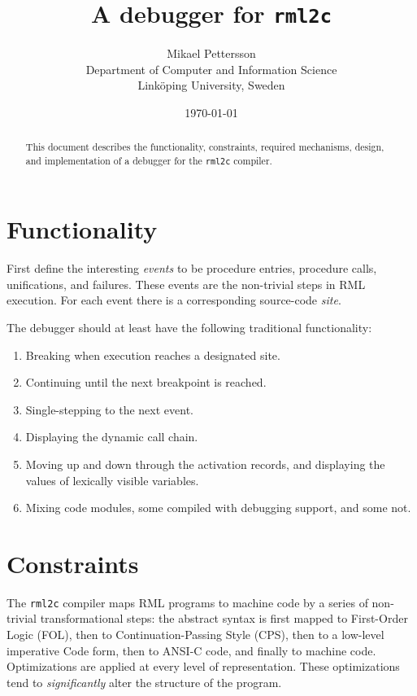 \documentclass[12pt,a4paper]{article}
\begin{document}
%
\title{		A debugger for \texttt{rml2c}}
\author{	Mikael Pettersson\\
		Department of Computer and Information Science\\
		Link{\"o}ping University, Sweden}
\date{		\today}
\maketitle
%
\begin{abstract}
This document describes the functionality, constraints, required mechanisms,
design, and implementation of a debugger for the \texttt{rml2c} compiler.
\end{abstract}
%
\section{Functionality}
First define the interesting \emph{events} to be
procedure entries, procedure calls, unifications, and failures.
These events are the non-trivial steps in RML execution.
For each event there is a corresponding source-code \emph{site}.

The debugger should at least have the following traditional functionality:
\begin{enumerate}
\item Breaking when execution reaches a designated site.
\item Continuing until the next breakpoint is reached.
\item Single-stepping to the next event.
\item Displaying the dynamic call chain.
\item Moving up and down through the activation records,
and displaying the values of lexically visible variables.
\item Mixing code modules, some compiled with debugging
support, and some not.
\end{enumerate}
%
\section{Constraints}
The \texttt{rml2c} compiler maps RML programs to machine code
by a series of non-trivial transformational steps:
the abstract syntax is first mapped to First-Order Logic (FOL),
then to Continuation-Passing Style (CPS), then to a low-level imperative Code form,
then to ANSI-C code, and finally to machine code.
Optimizations are applied at every level of representation.
These optimizations tend to \emph{significantly} alter the structure
of the program.
\end{document}
